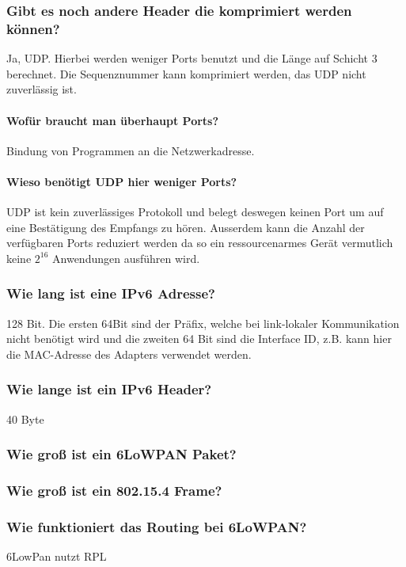 		\subsubsection{Gibt es noch andere Header die komprimiert werden können?}
		Ja, UDP. Hierbei werden weniger Ports benutzt und die Länge auf Schicht 3 berechnet. Die Sequenznummer kann komprimiert werden, das UDP nicht zuverlässig ist.
		\paragraph{Wofür braucht man überhaupt Ports?} Bindung von Programmen an die Netzwerkadresse.
		\paragraph{Wieso benötigt UDP hier weniger Ports?} UDP ist kein zuverlässiges Protokoll und belegt deswegen keinen Port um auf eine Bestätigung des Empfangs zu hören.	Ausserdem kann die Anzahl der verfügbaren Ports reduziert werden da so ein ressourcenarmes Gerät vermutlich keine $2^{16}$ Anwendungen ausführen wird.	
		
		
		
		
		
		\subsubsection{Wie lang ist eine IPv6\- Adresse?}
		128 Bit. Die ersten 64Bit sind der Präfix, welche bei link-lokaler Kommunikation nicht benötigt wird und die zweiten 64 Bit sind die Interface ID, z.B. kann hier die MAC-Adresse des Adapters verwendet werden.
		\subsubsection{Wie lange ist ein IPv6\- Header?}
		40 Byte
		\subsubsection{Wie groß ist ein 6LoWPAN Paket?}
		\subsubsection{Wie groß ist ein 802.15.4 Frame?}
		
		\subsubsection{Wie funktioniert das Routing bei 6LoWPAN?}
		6LowPan nutzt RPL
